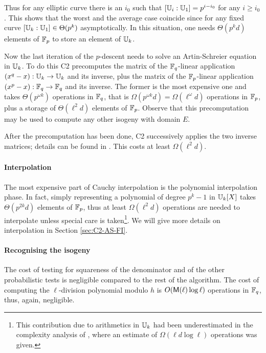 

Thus for any elliptic curve there is an $i_0$ such that $[\mathbb{U}_i:\mathbb{U}_1] =
p^{i-i_0}$ for any $i \ge i_0$. This shows that the worst and the
average case coincide since for any fixed curve $[\mathbb{U}_k:\mathbb{U}_1] \in
\Theta(p^k)$ asymptotically. In this situation, one needs
$\Theta(p^kd)$ elements of $\mathbb{F}_p$ to store an element of $\mathbb{U}_k$.

Now the last iteration of the $p$-descent needs to solve an
Artin-Schreier equation in $\mathbb{U}_k$. To do this C2 precomputes the
matrix of the $\mathbb{F}_q$-linear application $(x^q-x):\mathbb{U}_k\rightarrow\mathbb{U}_k$
and its inverse, plus the matrix of the $\mathbb{F}_p$-linear application
$(x^p-x):\mathbb{F}_q\rightarrow\mathbb{F}_q$ and its inverse. The former is the most
expensive one and takes $\Theta(p^{\omega k})$ operations in $\mathbb{F}_q$,
that is $\Omega(p^{\omega k}d) = \Omega(\ell^\omega d)$ operations in
$\mathbb{F}_p$, plus a storage of $\Theta(\ell^2d)$ elements of
$\mathbb{F}_p$. Observe that this precomputation may be used to compute any
other isogeny with domain $E$.

After the precomputation has been done, C2 successively applies the
two inverse matrices; details can be found in
\cite[$\S$2.4]{couveignes96}. This costs at least $\Omega(\ell^2d)$.


\paragraph{Interpolation}
The most expensive part of Cauchy interpolation is the polynomial
interpolation phase. In fact, simply representing a polynomial of
degree $p^k-1$ in $\mathbb{U}_k[X]$ takes $\Theta(p^{2k}d)$ elements of
$\mathbb{F}_p$, thus at least $\Omega(\ell^2d)$ operations are needed to
interpolate unless special care is taken\footnote{This contribution
  due to arithmetics in $\mathbb{U}_k$ had been underestimated in the
  complexity analysis of \cite{couveignes96}, where an estimate of
  $\Omega(\ell d\log\ell)$ operations was given.}. We will give more
details on interpolation in Section \ref{sec:C2-AS-FI}.


\paragraph{Recognising the isogeny}
The cost of testing for squareness of the denominator and of the other
probabilistic tests is negligible compared to the rest of the
algorithm. The cost of computing the $\ell$-division polynomial modulo
$h$ is $O(\mathsf{M}(\ell)\log\ell)$ operations in $\mathbb{F}_q$, thus, again,
negligible.

